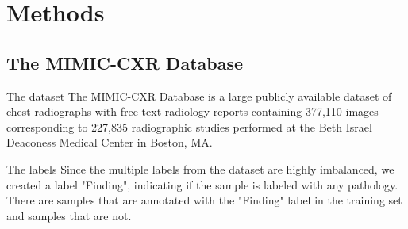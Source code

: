     \begin{frame}[label={mopoe_graph}]


    \end{frame}


    \section{Methods}

    \subsection{The MIMIC-CXR Database}
    \begin{frame}{The dataset}
        The MIMIC-CXR Database \cite{johnson2019mimic} is a large publicly available dataset of chest radiographs with free-text radiology reports containing 377,110 images corresponding to 227,835 radiographic studies performed at the Beth Israel Deaconess Medical Center in Boston, MA.

    \end{frame}

    \begin{frame}
    \end{frame}

    \begin{frame}{The labels}
        Since the multiple labels from the dataset are highly imbalanced, we created a label "Finding", indicating if the sample is labeled with any pathology.\\
        There are  samples that are annotated with the "Finding" label in the training set and  samples that are not.
    \end{frame}

